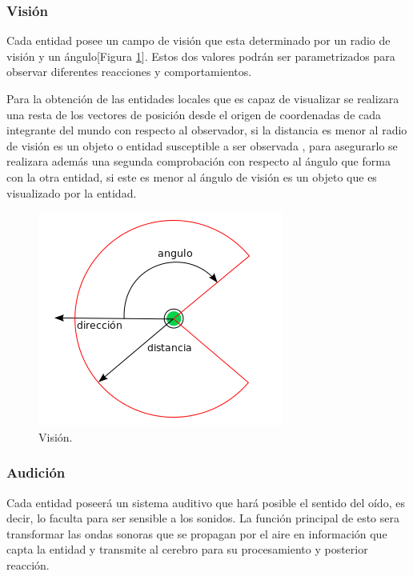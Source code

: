 \subsubsection{Visión}
\label{sec:vision}

Cada entidad posee un campo de visión que esta determinado por un radio de visión y un ángulo[Figura \ref{fig:../images/angulo_vision.png}]. Estos dos valores podrán ser parametrizados para observar diferentes reacciones y comportamientos. 

Para la obtención de las entidades locales que es capaz de visualizar se realizara una resta de los vectores de posición desde el origen de coordenadas de cada integrante del mundo con respecto al observador, si la distancia es menor al radio de visión es un objeto o entidad susceptible a ser observada , para asegurarlo se realizara además una segunda comprobación con respecto al ángulo que forma con la otra entidad, si este  es menor al ángulo de visión es un objeto que es visualizado por la entidad.

\begin{figure}[h]
 \centering
 \includegraphics[scale=0.7]{../images/angulo_vision.png}
 \caption{Visión.}
 \label{fig:../images/angulo_vision.png}
\end{figure}


\subsubsection{Audición}
\label{sec:audicion}

Cada entidad poseerá un sistema auditivo que hará posible el sentido del oído, es decir, lo faculta para ser sensible a los sonidos. La función principal de esto sera transformar las ondas sonoras que se propagan por el aire en información que capta la entidad y transmite al cerebro para su procesamiento y posterior reacción.


